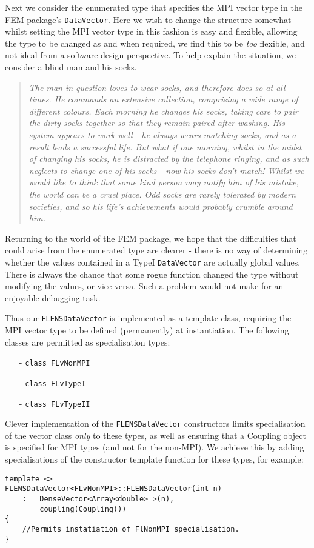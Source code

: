 Next we consider the enumerated type that specifies the MPI vector type in the FEM package's \texttt{DataVector}. Here we wish to change the structure somewhat - whilst setting the MPI vector type in this fashion is easy and flexible, allowing the type to be changed as and when required, we find this to be \emph{too} flexible, and not ideal from a software design perspective. To help explain the situation, we consider a blind man and his socks. \\
\begin{quote}
\emph{The man in question loves to wear socks, and therefore does so at all times. He commands an extensive collection, comprising a wide range of different colours. Each morning he changes his socks, taking care to pair the dirty socks together so that they remain paired after washing. His system appears to work well - he always wears matching socks, and as a result leads a successful life. But what if one morning, whilst in the midst of changing his socks, he is distracted by the telephone ringing, and as such neglects to change one of his socks - now his socks don't match! Whilst we would like to think that some kind person may notify him of his mistake, the world can be a cruel place. Odd socks are rarely tolerated by modern societies, and so his life's achievements would probably crumble around him.}\\
\end{quote}
Returning to the world of the FEM package, we hope that the difficulties that could arise from the enumerated type are clearer - there is no way of determining whether the values contained in a TypeI \texttt{DataVector} are actually global values. There is always the chance that some rogue function changed the type without modifying the values, or vice-versa. Such a problem would not make for an enjoyable debugging task.

Thus our \texttt{FLENSDataVector} is implemented as a template class, requiring the MPI vector type to be defined (permanently) at instantiation. The following classes are permitted as specialisation types:
\begin{itemize}
   \item[-] \texttt{class FLvNonMPI}
   \item[-] \texttt{class FLvTypeI}
   \item[-] \texttt{class FLvTypeII}
\end{itemize}

Clever implementation of the \texttt{FLENSDataVector} constructors limits specialisation of the vector class \emph{only} to these types, as well as ensuring that a Coupling object is specified for MPI types (and not for the non-MPI). We achieve this by adding specialisations of the constructor template function for these types, for example:
\begin{lstlisting}
template <>
FLENSDataVector<FLvNonMPI>::FLENSDataVector(int n)
	: 	DenseVector<Array<double> >(n),
		coupling(Coupling())
{
	//Permits instatiation of FlNonMPI specialisation.
}
\end{lstlisting}

